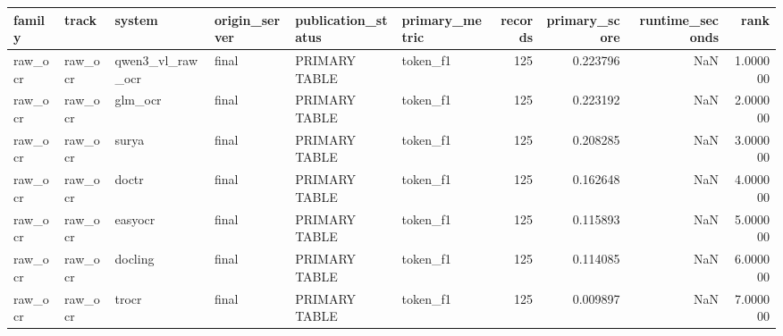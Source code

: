 \begin{tabular}{llllllrrrr}
\toprule
family & track & system & origin\_server & publication\_status & primary\_metric & records & primary\_score & runtime\_seconds & rank \\
\midrule
raw\_ocr & raw\_ocr & qwen3\_vl\_raw\_ocr & final & PRIMARY TABLE & token\_f1 & 125 & 0.223796 & NaN & 1.000000 \\
raw\_ocr & raw\_ocr & glm\_ocr & final & PRIMARY TABLE & token\_f1 & 125 & 0.223192 & NaN & 2.000000 \\
raw\_ocr & raw\_ocr & surya & final & PRIMARY TABLE & token\_f1 & 125 & 0.208285 & NaN & 3.000000 \\
raw\_ocr & raw\_ocr & doctr & final & PRIMARY TABLE & token\_f1 & 125 & 0.162648 & NaN & 4.000000 \\
raw\_ocr & raw\_ocr & easyocr & final & PRIMARY TABLE & token\_f1 & 125 & 0.115893 & NaN & 5.000000 \\
raw\_ocr & raw\_ocr & docling & final & PRIMARY TABLE & token\_f1 & 125 & 0.114085 & NaN & 6.000000 \\
raw\_ocr & raw\_ocr & trocr & final & PRIMARY TABLE & token\_f1 & 125 & 0.009897 & NaN & 7.000000 \\
\bottomrule
\end{tabular}
